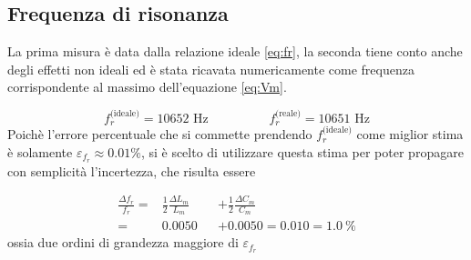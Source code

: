 \documentclass[12pt,italian]{article}
\begin{document}
\subsection{Frequenza di risonanza}\label{sec:resFreq}
La prima misura è data dalla relazione ideale \eqref{eq:fr}, la seconda tiene
conto anche degli effetti non ideali ed è stata ricavata numericamente come
frequenza corrispondente al massimo dell'equazione \eqref{eq:Vm}.

\begin{equation*}
	f_{r}^{\text{(ideale)}} = 10652 \text{ Hz} \hspace{2cm} f_{r}^{\text{(reale)}} = 10651 \text{ Hz}
\end{equation*}
Poichè l'errore percentuale che si commette prendendo $f_{r}^{\text{(ideale)}}$
come miglior stima è solamente $\varepsilon_{f_r} \approx 0.01\%$, si è scelto
di utilizzare questa stima per poter propagare con semplicità l'incertezza, che
risulta essere

\begin{equation*}
	\begin{alignedat}{2}
		\frac{\Delta f_{r}}{f_{r}} = & \frac{1}{2} \frac{\Delta L_{m}}{L_{m}} &  & + \frac{1}{2} \frac{\Delta C_{m}}{C_{m}} \\
		=                            & 0.0050                                 &  & + 0.0050
		= 0.010 = 1.0 \ \%
	\end{alignedat}
\end{equation*}
ossia due ordini di grandezza maggiore di $\varepsilon_{f_r}$
\end{document}
